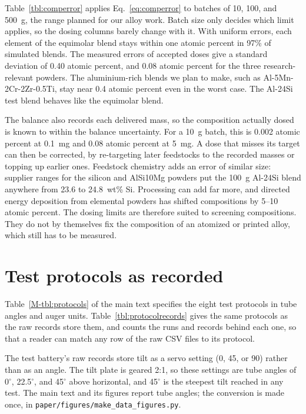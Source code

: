 \documentclass[10pt]{article}
\begin{document}
Table~\ref{tbl:comperror} applies Eq.~\ref{eq:comperror} to batches of 10, 100,
and 500~g, the range planned for our alloy work. Batch size only decides which
limit applies, so the dosing columns barely change with it. With uniform errors,
each element of the equimolar blend stays within one atomic percent in 97\% of
simulated blends. The measured errors of accepted doses give a standard
deviation of 0.40 atomic percent, and 0.08 atomic percent for the three
research-relevant powders. The aluminium-rich blends we plan to make, such as
Al-5Mn-2Cr-2Zr-0.5Ti, stay near 0.4 atomic percent even in the worst case. The
Al-24Si test blend behaves like the equimolar blend.

The balance also records each delivered mass, so the composition actually dosed
is known to within the balance uncertainty. For a 10~g batch, this is 0.002
atomic percent at 0.1~mg and 0.08 atomic percent at 5~mg. A dose that misses its
target can then be corrected, by re-targeting later feedstocks to the recorded
masses or topping up earlier ones. Feedstock chemistry adds an error of similar
size: supplier ranges for the silicon and AlSi10Mg powders put the 100~g
Al-24Si blend anywhere from 23.6 to 24.8~wt\% Si. Processing can add far more,
and directed energy deposition from elemental powders has shifted compositions
by 5--10 atomic percent.\cite{Moorehead2020Throughput,Chen2020Elemental} The
dosing limits are therefore suited to screening compositions. They do not by
themselves fix the composition of an atomized or printed alloy, which still has
to be measured.



\clearpage

\section{Test protocols as recorded}
\label{sec:protocols}

Table~\ref*{M-tbl:protocols} of the main text specifies the eight test protocols in tube angles and
auger units. Table~\ref{tbl:protocolrecords} gives the same protocols as the raw
records store them, and counts the runs and records behind each one, so that a
reader can match any row of the raw CSV files to its protocol.

The test battery's raw records store tilt as a servo setting (0, 45, or 90)
rather than as an angle. The tilt plate is geared 2:1, so these settings are
tube angles of 0$^\circ$, 22.5$^\circ$, and 45$^\circ$ above horizontal, and
45$^\circ$ is the steepest tilt reached in any test. The main text and its
figures report tube angles; the conversion is made
once, in \texttt{paper/figures/make\_data\_figures.py}.
\end{document}
